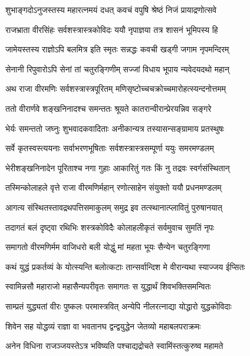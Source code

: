 \twolineshloka
{शुभाङ्गदोऽनुजस्तस्य महारत्नमयं दधत्}
{कवचं वपुषि श्रेष्ठं निजं प्रायाद्रणोत्सवे}%

\twolineshloka
{राजभ्राता वीरसिंहः सर्वशस्त्रास्त्रकोविदः}
{ययौ नृपाज्ञया तत्र शासनं भूमिपस्य हि}%

\twolineshloka
{जामेयस्तस्य राज्ञोऽपि बलमित्र इति स्मृतः}
{सन्नद्धः कवची खड्गी जगाम नृपमन्दिरम्}%

\twolineshloka
{सेनानी रिपुवारोऽपि सेनां तां चतुरङ्गिणीम्}
{सज्जां विधाय भूपाय न्यवेदयदथो महान्}%

\twolineshloka
{अथ राजा वीरमणिः सर्वशस्त्रास्त्रपूरितम्}
{मणिसृष्टोच्चचक्रोच्चमारोहत्स्यन्दनोत्तमम्}%

\twolineshloka
{ततो वीरार्णवे शङ्खनिनादश्च समन्ततः}
{श्रूयते कातरान्वीरान्प्रेरयन्निव सङ्गरे}%

\twolineshloka
{भेर्यः समन्ततो जघ्नुः शुभवादकवादिताः}
{अनीकान्यत्र तस्यासन्सङ्ग्रामाय प्रतस्थुषः}%

\twolineshloka
{सर्वे कृतस्वस्त्ययनाः सर्वाभरणभूषिताः}
{सर्वशस्त्रास्त्रसम्पूर्णा ययुः समरमण्डलम्}%

\twolineshloka
{भेरीशङ्खनिनादेन पूरिताश्च नगा गुहाः}
{आकारितुं गतः किं नु तद्रवः स्वर्गसंस्थितान्}%

\twolineshloka
{तस्मिन्कोलाहले वृत्ते राजा वीरमणिर्महान्}
{रणोत्साहेन संयुक्तो ययौ प्रधनमण्डलम्}%

\twolineshloka
{आगत्य संस्थितस्तावद्रथपत्तिसमाकुलम्}
{समुद्र इव तत्स्थानात्प्लावितुं पुरुषानयात्}%

\twolineshloka
{तदागतं बलं दृष्ट्वा रथिभिः शस्त्रकोविदैः}
{कोलाहलीकृतं सर्वमुवाच सुमतिं नृपः}%


\twolineshloka
{समागतो वीरमणिर्मम वाजिधरो बली}
{योद्धुं मां महता भूयः सैन्येन चतुरङ्गिणा}%

\twolineshloka
{कथं युद्धं प्रकर्तव्यं के योत्स्यन्ति बलोत्कटाः}
{तान्सर्वान्दिश मे वीरान्यथा स्याज्जय ईप्सितः}%


\twolineshloka
{स्वामिन्नसौ महाराजो महासैन्यपरीवृतः}
{समागतः स युद्धार्थं शिवभक्तिसमन्वितः}%

\twolineshloka
{साम्प्रतं युद्ध्यतां वीरः पुष्कलः परमास्त्रवित्}
{अन्येपि नीलरत्नाद्या योद्धारो युद्धकोविदाः}%

\twolineshloka
{शिवेन सह योद्धव्यं राज्ञा वा भवतानघ}
{द्वन्द्वयुद्धेन जेतव्यो महाबलपराक्रमः}%

\twolineshloka
{अनेन विधिना राजञ्जयस्तेऽत्र भविष्यति}
{पश्चाद्यद्रोचते स्वामिंस्तत्कुरुष्व महामते}%

